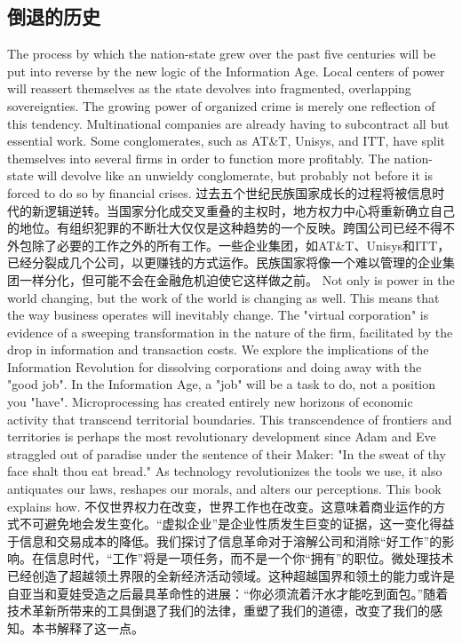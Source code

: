 \subsection{倒退的历史}
\begin{paracol}{2}[]
The process by which the nation-state grew over the past five centuries will be put into reverse by the new logic of the Information Age. Local centers of power will reassert themselves as the state devolves into fragmented, overlapping sovereignties. The growing power of organized crime is merely one reflection of this tendency. Multinational companies are already having to subcontract all but essential work. Some conglomerates, such as AT\&T, Unisys, and ITT, have split themselves into several firms in order to function more profitably. The nation-state will devolve like an unwieldy conglomerate, but probably not before it is forced to do so by financial crises.
\switchcolumn
过去五个世纪民族国家成长的过程将被信息时代的新逻辑逆转。当国家分化成交叉重叠的主权时，地方权力中心将重新确立自己的地位。有组织犯罪的不断壮大仅仅是这种趋势的一个反映。跨国公司已经不得不外包除了必要的工作之外的所有工作。一些企业集团，如AT\&T、Unisys和ITT，已经分裂成几个公司，以更赚钱的方式运作。民族国家将像一个难以管理的企业集团一样分化，但可能不会在金融危机迫使它这样做之前。
\switchcolumn*
Not only is power in the world changing, but the work of the world is changing as well. This means that the way business operates will inevitably change. The "virtual corporation" is evidence of a sweeping transformation in the nature of the firm, facilitated by the drop in information and transaction costs. We explore the implications of the Information Revolution for dissolving corporations and doing away with the "good job". In the Information Age, a "job"  will be a task to do, not a position you "have". Microprocessing has created entirely new horizons of economic activity that transcend territorial boundaries. This transcendence of frontiers and territories is perhaps the most revolutionary development since Adam and Eve straggled out of paradise under the sentence of their Maker: "In the sweat of thy face shalt thou eat bread." As technology revolutionizes the tools we use, it also antiquates our laws, reshapes our morals, and alters our perceptions. This book explains how.
\switchcolumn
不仅世界权力在改变，世界工作也在改变。这意味着商业运作的方式不可避免地会发生变化。“虚拟企业”是企业性质发生巨变的证据，这一变化得益于信息和交易成本的降低。我们探讨了信息革命对于溶解公司和消除“好工作”的影响。在信息时代，“工作”将是一项任务，而不是一个你“拥有”的职位。微处理技术已经创造了超越领土界限的全新经济活动领域。这种超越国界和领土的能力或许是自亚当和夏娃受造之后最具革命性的进展：“你必须流着汗水才能吃到面包。”随着技术革新所带来的工具倒退了我们的法律，重塑了我们的道德，改变了我们的感知。本书解释了这一点。

\end{paracol}
